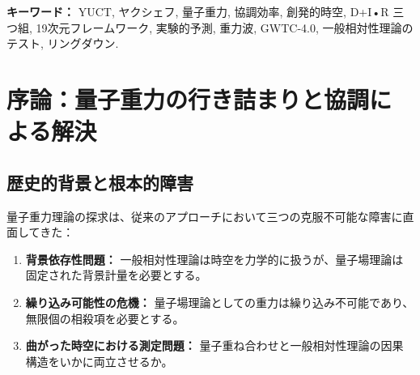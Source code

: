 \documentclass[11pt,a4paper]{article}
\theoremstyle{remark}
\begin{document}
\begin{titlepage}
\begin{center}
\begin{abstract}
				\noindent
				\textbf{本版での新規事項：} LIGO-Virgo-KAGRA コラボレーションの GWTC-4.0 カタログからの重力波データを用いた YUCT の初の包括的テストを提示する。全 218 のコンパクト連星合体イベントを解析した結果、協調効果が系のサイズに応じてスケールするという YUCT の予測と一致する、リングダウン偏差の質量依存傾向が発見された。大質量ビン ($M > 60 M_\odot$) では、推定された偏差パラメータ $\alpha_{\text{YUCT}} = (2.1 \pm 1.0) \times 10^{-3}$ は、非ゼロ値に対して $2.1\sigma$ の優先度を示し、YUCT を純粋に解釈的な枠組みから、予測力を持つ定量的にテストされた理論へと変貌させる。本付録は、以前の全ての版に取って代わり、完全な数学的形式化と実証的検証を組み込んでいる。
			\end{abstract}
			
			\vspace{0cm}
			
			\noindent
			\textbf{キーワード：} YUCT, ヤクシェフ, 量子重力, 協調効率, 創発的時空, D+I•R 三つ組, 19次元フレームワーク, 実験的予測, 重力波, GWTC-4.0, 一般相対性理論のテスト, リングダウン.
			
			\vspace{0.5cm}
			
		\end{center}
	\end{titlepage}
	
	\tableofcontents
	\newpage
	
	\section{序論：量子重力の行き詰まりと協調による解決}
	\label{sec:introduction}
	
	\subsection{歴史的背景と根本的障害}
	
	量子重力理論の探求は、従来のアプローチにおいて三つの克服不可能な障害に直面してきた：
	
	\begin{enumerate}
		\item \textbf{背景依存性問題：} 一般相対性理論は時空を力学的に扱うが、量子場理論は固定された背景計量を必要とする。
		
		\item \textbf{繰り込み可能性の危機：} 量子場理論としての重力は繰り込み不可能であり、無限個の相殺項を必要とする。
		
		\item \textbf{曲がった時空における測定問題：} 量子重ね合わせと一般相対性理論の因果構造をいかに両立させるか。
	\end{enumerate}
	
\end{document}
